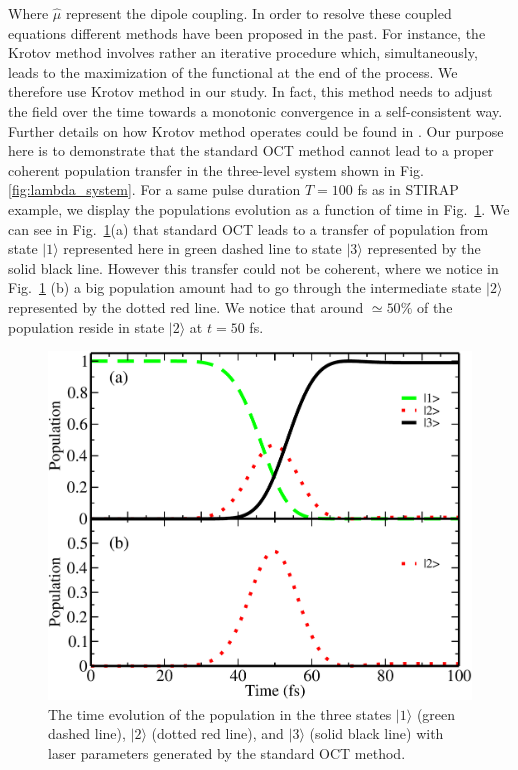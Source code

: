 \documentclass[]{interact}
\theoremstyle{plain}%
\theoremstyle{definition}
\theoremstyle{remark}
\begin{document}
Where $\hat\mu$ represent the dipole coupling.
In order to resolve these coupled equations different methods have been 
proposed \cite{Rabitz1, Palao2} in the past. For instance, the Krotov method 
involves 
rather an 
iterative procedure which, simultaneously, leads to the maximization of the 
functional at the end of the process. We therefore use Krotov method in our 
study. In 
fact, this method needs to adjust the field over the time towards a monotonic 
convergence in a self-consistent way. Further details on how Krotov method 
operates could be found in \cite{Tannor2, Somloi, Palao2}.
Our purpose here is to demonstrate that the standard OCT method cannot lead to 
a proper coherent 
population transfer in the three-level system shown in Fig. 
\ref{fig:lambda_system}. 
For a same pulse duration $T=100$ fs as in STIRAP example, we display the  
populations evolution as a function of time in 
Fig.~\ref{fig:Populations-OCT-Standard}. We can see in 
Fig.~\ref{fig:Populations-OCT-Standard}(a) that standard OCT leads to 
a transfer of population from state $|1\rangle$ represented here in 
green dashed line to state $|3\rangle$ represented by the solid black 
line. However this transfer could not be coherent, where we notice in 
Fig.~\ref{fig:Populations-OCT-Standard} (b) a big 
population amount had to go through the intermediate state $|2\rangle$ 
represented by the dotted red line. We notice that around $\simeq50\%$ of the 
population reside in state $|2\rangle$ at $t=50$ fs.
\begin{figure}[h!]
\centering
\includegraphics[width=0.7\linewidth]{Figure4}
\caption{The time evolution of the population in the three states $|1\rangle$ 
(green dashed line), 
$|2\rangle$ (dotted red line), and $|3\rangle$ (solid black line) with laser 
parameters generated by the standard OCT method.
\label{fig:Populations-OCT-Standard}}
\end{figure}
\end{document}

